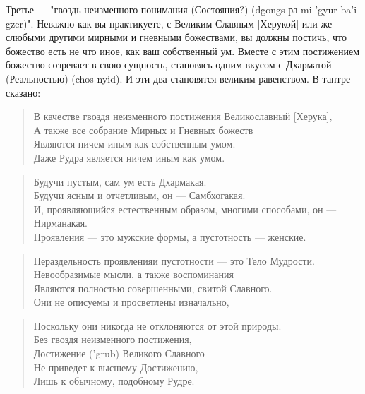 Третье — "гвоздь неизменного понимания (Состояния?) (dgongs ра mi 'gyur ba'i gzer)".
Неважно как вы практикуете, с Великим-Славным [Херукой] или же слюбыми другими
мирными и гневными божествами, вы должны постичь, что божество есть не что иное, как
ваш собственный ум. Вместе с этим постижением божество созревает в свою сущность,
становясь одним вкусом с Дхарматой (Реальностью) (chos nyid). И эти два становятся великим
равенством. В тантре сказано:

\begin{verse}
В качестве гвоздя неизменного постижения Великославный [Херука],\\
А также все собрание Мирных и Гневных божеств\\
Являются ничем иным как собственным умом.\\
Даже Рудра является ничем иным как умом.\\
\end{verse}

\newpage

\begin{verse}
Будучи пустым, сам ум есть Дхармакая.\\
Будучи ясным и отчетливым, он — Самбхогакая.\\
И, проявляющийся естественным образом, многими способами, он — Нирманакая.\\
Проявления — это мужские формы, а пустотность — женские.\\
\end{verse}

\begin{verse}
Нераздельность проявленияи пустотности — это Тело Мудрости.\\
Невообразимые мысли, а также воспоминания\\
Являются полностью совершенными, свитой Славного.\\
Они не описуемы и просветлены изначально,\\
\end{verse}

\begin{verse}
Поскольку они никогда не отклоняются от этой природы.\\
Без гвоздя неизменного постижения,\\
Достижение ('grub) Великого Славного\\
Не приведет к высшему Достижению,\\
Лишь к обычному, подобному Рудре.
\end{verse}


